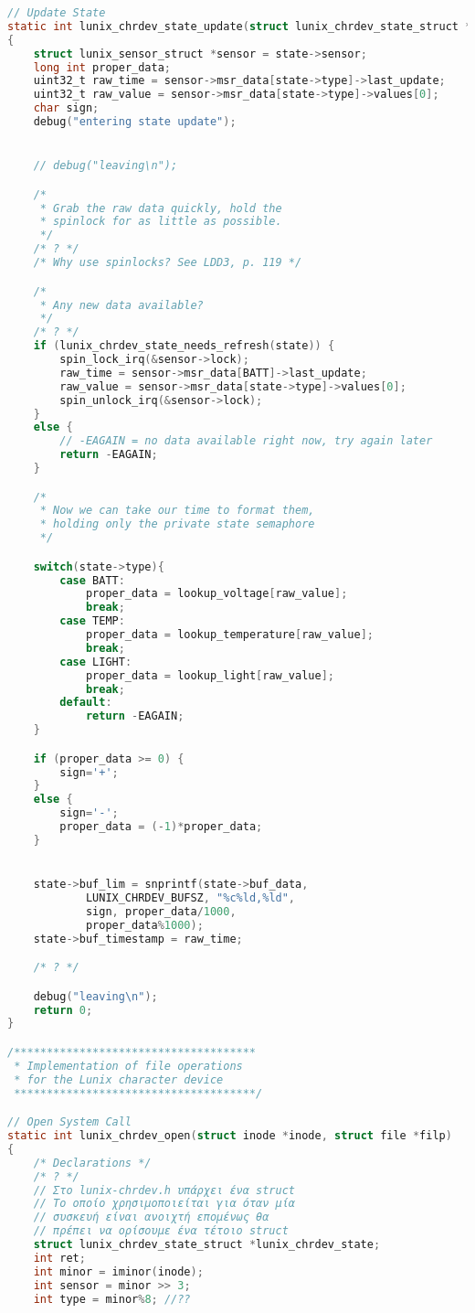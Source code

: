 \documentclass{article}
\begin{document}
\begin{lstlisting}[language=C,basicstyle=\tiny]
// Update State
static int lunix_chrdev_state_update(struct lunix_chrdev_state_struct *state)
{
	struct lunix_sensor_struct *sensor = state->sensor;
	long int proper_data;
	uint32_t raw_time = sensor->msr_data[state->type]->last_update;
	uint32_t raw_value = sensor->msr_data[state->type]->values[0];
	char sign;
	debug("entering state update");


	// debug("leaving\n");

	/*
	 * Grab the raw data quickly, hold the
	 * spinlock for as little as possible.
	 */
	/* ? */
	/* Why use spinlocks? See LDD3, p. 119 */

	/*
	 * Any new data available?
	 */
	/* ? */
	if (lunix_chrdev_state_needs_refresh(state)) {
		spin_lock_irq(&sensor->lock);
		raw_time = sensor->msr_data[BATT]->last_update;
		raw_value = sensor->msr_data[state->type]->values[0];
		spin_unlock_irq(&sensor->lock);
	}
	else { 
		// -EAGAIN = no data available right now, try again later
		return -EAGAIN;
	}

	/*
	 * Now we can take our time to format them,
	 * holding only the private state semaphore
	 */

	switch(state->type){
		case BATT:
			proper_data = lookup_voltage[raw_value]; 
			break;
		case TEMP:
			proper_data = lookup_temperature[raw_value];
			break;
		case LIGHT:
			proper_data = lookup_light[raw_value];
			break;
		default:
			return -EAGAIN;
	}

	if (proper_data >= 0) { 
		sign='+';
	}
	else {
		sign='-';
		proper_data = (-1)*proper_data;
	}


	state->buf_lim = snprintf(state->buf_data,
			LUNIX_CHRDEV_BUFSZ, "%c%ld,%ld",
			sign, proper_data/1000,
			proper_data%1000);
	state->buf_timestamp = raw_time;

	/* ? */

	debug("leaving\n");
	return 0;
}

/*************************************
 * Implementation of file operations
 * for the Lunix character device
 *************************************/

// Open System Call
static int lunix_chrdev_open(struct inode *inode, struct file *filp)
{
	/* Declarations */
	/* ? */
	// Στο lunix-chrdev.h υπάρχει ένα struct 
	// Το οποίο χρησιμοποιείται για όταν μία
	// συσκευή είναι ανοιχτή επομένως θα 
	// πρέπει να ορίσουμε ένα τέτοιο struct
	struct lunix_chrdev_state_struct *lunix_chrdev_state;
	int ret;
	int minor = iminor(inode);
	int sensor = minor >> 3;
	int type = minor%8; //?? 


\end{lstlisting}
\end{document}
